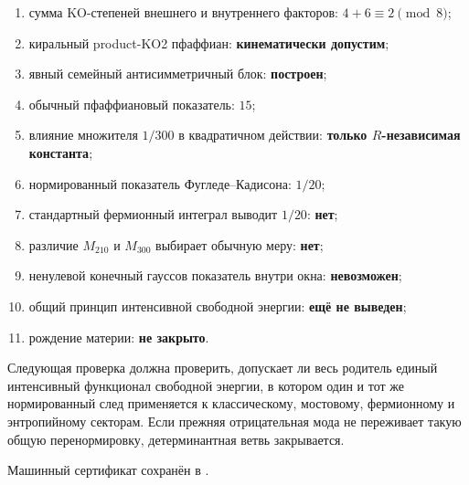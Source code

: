 \begin{protocol}
\begin{enumerate}
 \item сумма KO-степеней внешнего и внутреннего факторов:
 \textbf{$4+6\equiv2\pmod8$};
 \item киральный product-KO2 пфаффиан:
 \textbf{кинематически допустим};
 \item явный семейный антисимметричный блок:
 \textbf{построен};
 \item обычный пфаффиановый показатель:
 \textbf{$15$};
 \item влияние множителя $1/300$ в квадратичном действии:
 \textbf{только $R$-независимая константа};
 \item нормированный показатель Фугледе--Кадисона:
 \textbf{$1/20$};
 \item стандартный фермионный интеграл выводит $1/20$:
 \textbf{нет};
 \item различие $M_{210}$ и $M_{300}$ выбирает обычную меру:
 \textbf{нет};
 \item ненулевой конечный гауссов показатель внутри окна:
 \textbf{невозможен};
 \item общий принцип интенсивной свободной энергии:
 \textbf{ещё не выведен};
 \item рождение материи:
 \textbf{не закрыто}.
\end{enumerate}
\end{protocol}

Следующая проверка должна проверить, допускает ли весь родитель единый
интенсивный функционал свободной энергии, в котором один и тот же
нормированный след применяется к классическому, мостовому, фермионному и
энтропийному секторам. Если прежняя отрицательная мода не переживает такую
общую перенормировку, детерминантная ветвь закрывается.

Машинный сертификат сохранён в
.